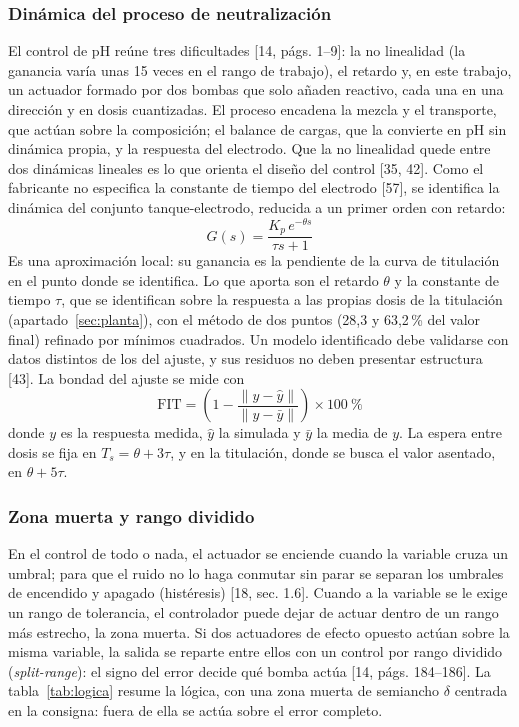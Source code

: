 \subsubsection{Dinámica del proceso de neutralización}\label{sec:dinamica}
El control de pH reúne tres dificultades [14, págs. 1–9]: la no linealidad (la ganancia varía unas 15 veces en el rango de trabajo), el retardo y, en este trabajo, un actuador formado por dos bombas que solo añaden reactivo, cada una en una dirección y en dosis cuantizadas. El proceso encadena la mezcla y el transporte, que actúan sobre la composición; el balance de cargas, que la convierte en pH sin dinámica propia, y la respuesta del electrodo. Que la no linealidad quede entre dos dinámicas lineales es lo que orienta el diseño del control [35, 42]. Como el fabricante no especifica la constante de tiempo del electrodo [57], se identifica la dinámica del conjunto tanque-electrodo, reducida a un primer orden con retardo:
\begin{equation}
G(s)=\frac{K_p\,e^{-\theta s}}{\tau s+1}\label{eq:fopdt}
\end{equation}
Es una aproximación local: su ganancia es la pendiente de la curva de titulación en el punto donde se identifica. Lo que aporta son el retardo $\theta$ y la constante de tiempo $\tau$, que se identifican sobre la respuesta a las propias dosis de la titulación (apartado~\ref{sec:planta}), con el método de dos puntos (28,3 y 63,2\,\% del valor final) refinado por mínimos cuadrados. Un modelo identificado debe validarse con datos distintos de los del ajuste, y sus residuos no deben presentar estructura [43]. La bondad del ajuste se mide con
\begin{equation}
\mathrm{FIT}=\left(1-\frac{\lVert y-\hat y\rVert}{\lVert y-\bar y\rVert}\right)\times100\ \%\label{eq:fit}
\end{equation}
donde $y$ es la respuesta medida, $\hat y$ la simulada y $\bar y$ la media de $y$. La espera entre dosis se fija en $T_s=\theta+3\tau$, y en la titulación, donde se busca el valor asentado, en $\theta+5\tau$.

\subsubsection{Zona muerta y rango dividido}\label{sec:zonamuerta}
En el control de todo o nada, el actuador se enciende cuando la variable cruza un umbral; para que el ruido no lo haga conmutar sin parar se separan los umbrales de encendido y apagado (histéresis) [18, sec. 1.6]. Cuando a la variable se le exige un rango de tolerancia, el controlador puede dejar de actuar dentro de un rango más estrecho, la zona muerta. Si dos actuadores de efecto opuesto actúan sobre la misma variable, la salida se reparte entre ellos con un control por rango dividido (\emph{split-range}): el signo del error decide qué bomba actúa [14, págs. 184–186]. La tabla~\ref{tab:logica} resume la lógica, con una zona muerta de semiancho $\delta$ centrada en la consigna: fuera de ella se actúa sobre el error completo.

